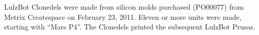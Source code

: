 %
%
%
%
%

LulzBot Clonedels were made from silicon molds purchased (PO00077)
from Metrix Createspace on February 23, 2011. Eleven or more units were made,
starting with ``Mars P4''. The Clonedels printed the subsequent LulzBot Prusas.














